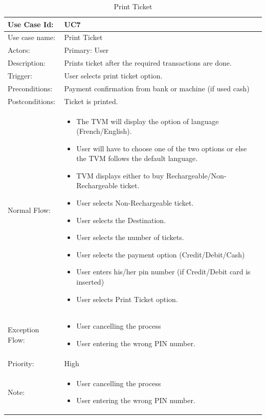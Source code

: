 \documentclass[11pt,oneside]{book}
\begin{document}
\begin{table}[h]
\centering
\begin{tabular}{|p{2.4cm}|p{11cm}|}
\hline
{Use Case Id: } & {UC7} \\
\hline
{Use case name:} & {Print Ticket}\\
\hline
{Actors: } & {Primary: User}\\
\hline
{Description:} & {Prints ticket after the required transactions are done.}\\
\hline
 
{Trigger:  } & {User selects print ticket option.}\\
\hline
{Preconditions:  } & {Payment confirmation from bank or machine (if used cash)}\\
\hline
{Postconditions:} & {Ticket is printed.}\\
\hline
{Normal Flow: } & {
\begin{itemize}

\item	The TVM will display the option of language (French/English).
\item	User will have to choose one of the two options or else the TVM follows the default language.
\item	TVM displays either to buy Rechargeable/Non-Rechargeable ticket.
\item	User selects Non-Rechargeable ticket.
\item	User selects the Destination.
\item	User selects the number of tickets.
\item	User selects the payment option (Credit/Debit/Cash)
\item	User enters his/her pin number (if Credit/Debit card is inserted)
\item	User selects Print Ticket option.



 
\end{itemize}
}\\
\hline
{Exception Flow: } & {
\begin{itemize}

\item	User cancelling the process
\item	User entering the wrong PIN number.

\end{itemize}
}\\
\hline
{Priority:  } & {High}\\
\hline
{Note:  } & {
\begin{itemize}

\item	User cancelling the process
\item	User entering the wrong PIN number.


\end{itemize}
}\\
\hline
\end{tabular}
\caption{Print Ticket}
\end{table}
\end{document}
